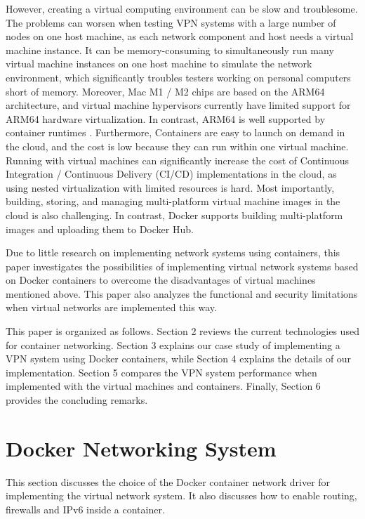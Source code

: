 \documentclass[article]{aaltoseries}
\begin{document}
However, creating a virtual computing environment can be slow and troublesome. The problems can worsen when testing VPN systems with a large number of nodes on one host machine, as each network component and host needs a virtual machine instance. It can be memory-consuming to simultaneously run many virtual machine instances on one host machine to simulate the network environment, which significantly troubles testers working on personal computers short of memory. Moreover, Mac M1 / M2 chips are based on the ARM64 architecture, and virtual machine hypervisors currently have limited support for ARM64 hardware virtualization. In contrast, ARM64 is well supported by container runtimes \cite{9852232}. Furthermore, Containers are easy to launch on demand in the cloud, and the cost is low because they can run within one virtual machine. Running with virtual machines can significantly increase the cost of Continuous Integration / Continuous Delivery (CI/CD) implementations in the cloud, as using nested virtualization with limited resources is hard. Most importantly, building, storing, and managing multi-platform virtual machine images in the cloud is also challenging. In contrast, Docker supports building multi-platform images \cite{dockermultiplatform} and uploading them to Docker Hub.

Due to little research on implementing network systems using containers, this paper investigates the possibilities of implementing virtual network systems based on Docker containers to overcome the disadvantages of virtual machines mentioned above. This paper also analyzes the functional and security limitations when virtual networks are implemented this way.

This paper is organized as follows. Section 2 reviews the current technologies used for container networking. Section 3 explains our case study of implementing a VPN system using Docker containers, while Section 4 explains the details of our implementation. Section 5 compares the VPN system performance when implemented with the virtual machines and containers. Finally, Section 6 provides the concluding remarks.



\section{Docker Networking System}
This section discusses the choice of the Docker container network driver for implementing the virtual network system. It also discusses how to enable routing, firewalls and IPv6 inside a container.
\end{document}
